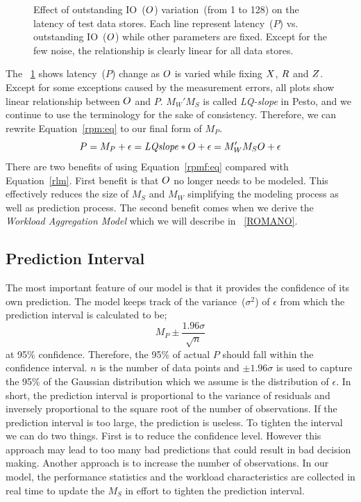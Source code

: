 \begin{figure}[!t]
\captionsetup{format=myformat}
\caption{Effect of outstanding IO~($O$) variation~(from 1 to 128) on the latency of test data stores.
Each line represent latency~($P$) vs. outstanding IO~($O$) while other parameters are fixed.
Except for the few noise, the relationship is clearly linear for all data stores.
}
\label{oioParam}
\end{figure}
The \figurename~\ref{oioParam} shows latency~($P$) change as $O$ is varied while fixing $X$, $R$ and $Z$.
Except for some exceptions caused by the measurement errors, all plots show linear relationship between $O$ and $P$.
$M_W'M_S$ is called \emph{LQ-slope} in Pesto, and we continue to use the terminology for the sake of consistency.
Therefore, we can rewrite Equation~\ref{rpm:eq} to our final form of $M_P$.
\begin{equation}\label{rpmf:eq}
P=M_P+\epsilon=\mathit{LQslope}*O+\epsilon=M_W'M_SO+\epsilon
\end{equation}
There are two benefits of using Equation~\ref{rpmf:eq} compared with Equation~\ref{rlm}.
First benefit is that $O$ no longer needs to be modeled.
This effectively reduces the size of $M_S$ and $M_W$ simplifying the modeling process as well as prediction process.
The second benefit comes when we derive the \emph{Workload Aggregation Model} which we will describe in \CHP~\ref{ROMANO}.

\subsection{Prediction Interval}
The most important feature of our model is that it provides the confidence of its own prediction.
The model keeps track of the variance~($\sigma^2$) of $\epsilon$ from which the prediction interval is calculated to be;
\begin{equation}\label{ci}
M_P\pm\frac{1.96\sigma}{\sqrt{n}}
\end{equation}
at 95\% confidence.
Therefore, the 95\% of actual $P$ should fall within the confidence interval.
$n$ is the number of data points and $\pm1.96\sigma$ is used to capture the 95\% of the Gaussian distribution which we assume is the distribution of $\epsilon$.
In short, the prediction interval is proportional to the variance of residuals and inversely proportional to the square root of the number of observations.
If the prediction interval is too large, the prediction is useless.
To tighten the interval we can do two things.
First is to reduce the confidence level.
However this approach may lead to too many bad predictions that could result in bad decision making.
Another approach is to increase the number of observations.
In our model, the performance statistics and the workload characteristics are collected in real time to update the $M_S$ in effort to tighten the prediction interval.

